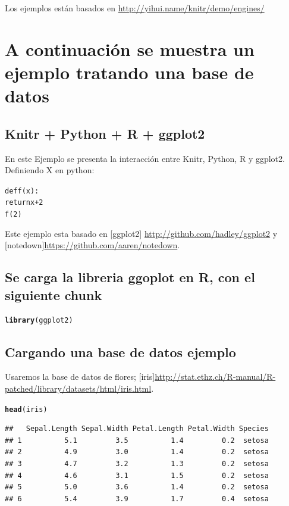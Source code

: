 \documentclass{article}\usepackage[]{graphicx}\usepackage[]{color}
\makeatletter
\newcommand{\hlstd}[1]{\textcolor[rgb]{0.345,0.345,0.345}{#1}}%
\newcommand{\hlkwd}[1]{\textcolor[rgb]{0.737,0.353,0.396}{\textbf{#1}}}%
\newenvironment{kframe}{%
 \def\at@end@of@kframe{}%
 \ifinner\ifhmode%
  \def\at@end@of@kframe{\end{minipage}}%
  \begin{minipage}{\columnwidth}%
 \fi\fi%
 \def\FrameCommand##1{\hskip\@totalleftmargin \hskip-\fboxsep
 \colorbox{shadecolor}{##1}\hskip-\fboxsep
     \hskip-\linewidth \hskip-\@totalleftmargin \hskip\columnwidth}%
 \MakeFramed {\advance\hsize-\width
   \@totalleftmargin\z@ \linewidth\hsize
   \@setminipage}}%
 {\par\unskip\endMakeFramed%
 \at@end@of@kframe}
\newenvironment{knitrout}{}{} %
\makeatother
\begin{document}
Los ejemplos están basados en  \url{http://yihui.name/knitr/demo/engines/}

\section*{A continuación se muestra un ejemplo tratando una base de datos}
\subsection*{Knitr + Python + R + ggplot2}
En este Ejemplo se presenta la interacción entre Knitr, Python, R y ggplot2.\\

Definiendo X en python:
\begin{knitrout}
\color{fgcolor}\begin{kframe}
\begin{alltt}
def f(x):
  return x + 2
f(2)
\end{alltt}
\end{kframe}
\end{knitrout}
Este ejemplo esta basado en [ggplot2] \url{http://github.com/hadley/ggplot2} y [notedown]\url{https://github.com/aaren/notedown}.
\subsection*{Se carga la libreria ggoplot en R, con el siguiente chunk}
\begin{knitrout}
\color{fgcolor}\begin{kframe}
\begin{alltt}
\hlkwd{library}\hlstd{(ggplot2)}
\end{alltt}
\end{kframe}
\end{knitrout}
\subsection*{Cargando una base de datos ejemplo}
Usaremos la base de datos de flores; [iris]\url{http://stat.ethz.ch/R-manual/R-patched/library/datasets/html/iris.html}.

\begin{knitrout}
\color{fgcolor}\begin{kframe}
\begin{alltt}
\hlkwd{head}\hlstd{(iris)}
\end{alltt}
\begin{verbatim}
##   Sepal.Length Sepal.Width Petal.Length Petal.Width Species
## 1          5.1         3.5          1.4         0.2  setosa
## 2          4.9         3.0          1.4         0.2  setosa
## 3          4.7         3.2          1.3         0.2  setosa
## 4          4.6         3.1          1.5         0.2  setosa
## 5          5.0         3.6          1.4         0.2  setosa
## 6          5.4         3.9          1.7         0.4  setosa
\end{verbatim}
\end{kframe}
\end{knitrout}
\end{document}
